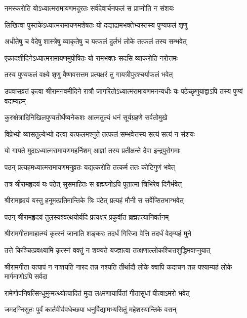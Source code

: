 \twolineshloka
{नमस्करोति योऽध्यात्मरामायणमदूरतः}
{सर्वदेवार्चनफलं स प्राप्नोति न संशयः} %

\twolineshloka
{लिखित्वा पुस्तकेऽध्यात्मरामायणमशेषतः}
{यो दद्याद्रामभक्तेभ्यस्तस्य पुण्यफलं शृणु} %

\twolineshloka
{अधीतेषु च वेदेषु शास्त्रेषु व्याकृतेषु च}
{यत्फलं दुर्लभं लोके तत्फलं तस्य सम्भवेत्} %

\twolineshloka
{एकादशीदिनेऽध्यात्मरामायणमुपोषितः}
{यो रामभक्तः सदसि व्याकरोति नरोत्तमः} %

\twolineshloka
{तस्य पुण्यफलं वक्ष्ये शृणु वैष्णवसत्तम}
{प्रत्यक्षरं तु गायत्रीपुरश्चर्याफलं भवेत्} %

\threelineshloka
{उपवासव्रतं कृत्वा श्रीरामनवमीदिने}
{रात्रौ जागरितोऽध्यात्मरामायणमनन्यधीः}
{यः पठेच्छृणुयाद्वाऽपि तस्य पुण्यं वदाम्यहम्} %

\twolineshloka
{कुरुक्षेत्रादिनिखिलपुण्यतीर्थेष्वनेकशः}
{आत्मतुल्यं धनं सूर्यग्रहणे सर्वतोमुखे} %

\twolineshloka
{विप्रेभ्यो व्यासतुल्येभ्यो दत्त्वा यत्फलमश्नुते}
{तत्फलं सम्भवेत्तस्य सत्यं सत्यं न संशयः} %

\twolineshloka
{यो गायते मुदाऽध्यात्मरामायणमहर्निशम्}
{आज्ञां तस्य प्रतीक्षन्ते देवा इन्द्रपुरोगमाः} %

\twolineshloka
{पठन् प्रत्यहमध्यात्मरामायणमनुव्रतः}
{यद्यत्करोति तत्कर्म ततः कोटिगुणं भवेत्} %

\twolineshloka
{तत्र श्रीरामहृदयं यः पठेत् सुसमाहितः}
{स ब्रह्मघ्नोऽपि पूतात्मा त्रिभिरेव दिनैर्भवेत्} %

\twolineshloka
{श्रीरामहृदयं यस्तु हनूमत्प्रतिमान्तिके}
{त्रिः पठेत् प्रत्यहं मौनी स सर्वेप्सितभाग्भवेत्} %

\twolineshloka
{पठन् श्रीरामहृदयं तुलस्यश्वत्थयोर्यदि}
{प्रत्यक्षरं प्रकुर्वीत ब्रह्महत्यानिवर्तनम्} %

\twolineshloka
{श्रीरामगीतामाहात्म्यं कृत्स्नं जानाति शङ्करः}
{तदर्धं गिरिजा वेत्ति तदर्धं वेद्म्यहं मुने} %

\twolineshloka
{तत्ते किञ्चित्प्रवक्ष्यामि कृत्स्नं वक्तुं न शक्यते}
{यज्ज्ञात्वा तत्क्षणाल्लोकश्चित्तशुद्धिमवाप्नुयात्} %

\threelineshloka
{श्रीरामगीता यत्पापं न नाशयति नारद}
{तन्न नश्यति तीर्थादौ लोके क्वापि कदाचन}
{तन्न पश्याम्यहं लोके मार्गमाणोऽपि सर्वदा} %

\twolineshloka
{रामेणोपनिषत्सिन्धुमुन्मत्थ्योत्पादितं मुदा}
{लक्ष्मणायार्पितां गीतासुधां पीत्वाऽमरो भवेत्} %

\twolineshloka
{जमदग्निसुतः पुर्वं कार्तवीर्यवधेच्छया}
{धनुर्विद्यामभ्यसितुं महेशस्यान्तिके वसन्} %

